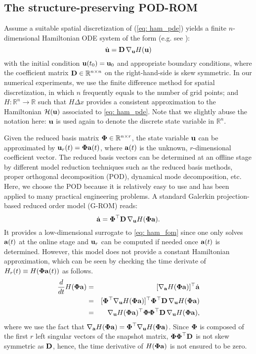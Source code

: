\documentclass[11pt]{article}
\begin{document}
\subsection{The structure-preserving POD-ROM}\label{sec: sp-pod}
\noindent \indent Assume a suitable spatial discretization of (\ref{eq: ham_pde}) yields a finite $n$-dimensional Hamiltonian ODE system of the form  (e.g. see \cite{Celledoni2012}):
\begin{equation}
\dot{{\bf u}} = {\bf D}\, \nabla_{{\bf u}} H({\bf u})
\label{eq: ham_fom}
\end{equation}
with the initial condition ${\bf u}(t_0)= {\bf u}_0$ and appropriate boundary conditions, where the coefficient matrix ${\bf D}\in \mathbb{R}^{n\times n}$ on the right-hand-side is skew symmetric. 
In our numerical experiments, we use the finite difference method for spatial discretization, in which $n$ frequently equals to the number of grid points; and $H: \mathbb{R}^n \rightarrow \mathbb{R}$ such that $H\Delta x$ provides a consistent approximation to the Hamiltonian $\mathcal{H}({\bf u})$ associated to \eqref{eq: ham_pde}. 
Note that we slightly abuse the notation here: ${\bf u}$ is used again to denote the discrete state variable in $\mathbb{R}^n$. 


Given the reduced basis matrix $\boldsymbol{\Phi}\in \mathbb{R}^{n\times r}$, the state variable ${\bf u}$ can be approximated by ${\bf u}_r(t) = \boldsymbol{\Phi} {\bf a}(t)$, where ${\bf a}(t)$ is the unknown, $r$-dimensional coefficient vector. The reduced basis vectors can be determined at an offline stage by different model reduction techniques such as the reduced basis methods, proper orthogonal decomposition (POD), dynamical mode decomposition, etc. Here, we choose the POD because it is relatively easy to use and has been applied to many practical engineering problems. 
A standard Galerkin projection-based reduced order model (G-ROM) reads: 
\begin{equation}
\dot{{\bf a}} = \boldsymbol{\Phi}^\top{\bf D}\, \nabla_{{\bf u}} H(\boldsymbol{\Phi} {\bf a}).
\label{eq: ham_rom1}
\end{equation}
It provides a low-dimensional surrogate to \eqref{eq: ham_fom} since one only solves ${\bf a}(t)$ at the online stage and ${\bf u}_r$ can be computed if needed once ${\bf a}(t)$ is determined. However, this model does not provide a constant Hamiltonian approximation, which can be seen by checking the time derivate of $H_r(t) \equiv H(\boldsymbol{\Phi} {\bf a}(t))$ as follows. 
\begin{eqnarray*}
\frac{d}{dt}H(\boldsymbol{\Phi} {\bf a})&=&[\nabla_{\bf a} H(\boldsymbol{\Phi} {\bf a})]^\top \dot{{\bf a}} \nonumber \\
				  &=&[\boldsymbol{\Phi}^\top \nabla_{{\bf u}} H(\boldsymbol{\Phi} {\bf a})]^\top \boldsymbol{\Phi}^\top{\bf D}\, \nabla_{{\bf u}} H(\boldsymbol{\Phi} {\bf a}) \nonumber \\
				  &=& \nabla_{{\bf u}} H(\boldsymbol{\Phi} {\bf a})^\top \boldsymbol{\Phi} \boldsymbol{\Phi}^\top{\bf D}\, \nabla_{{\bf u}} H(\boldsymbol{\Phi} {\bf a}),
\end{eqnarray*}
where we use the fact that
$
\nabla_{{\bf a}} H(\boldsymbol{\Phi} {\bf a}) = \boldsymbol{\Phi}^\top \nabla_{{\bf u}} H(\boldsymbol{\Phi} {\bf a})
$.
%
Since $\boldsymbol{\Phi}$ is composed of the first $r$ left singular vectors of the snapshot matrix, $\boldsymbol{\Phi}\boldsymbol{\Phi}^\top{\bf D}$ is not skew symmetric as ${\bf D}$, hence, the time derivative of $H(\boldsymbol{\Phi} {\bf a})$ is not ensured to be zero.
\end{document}
